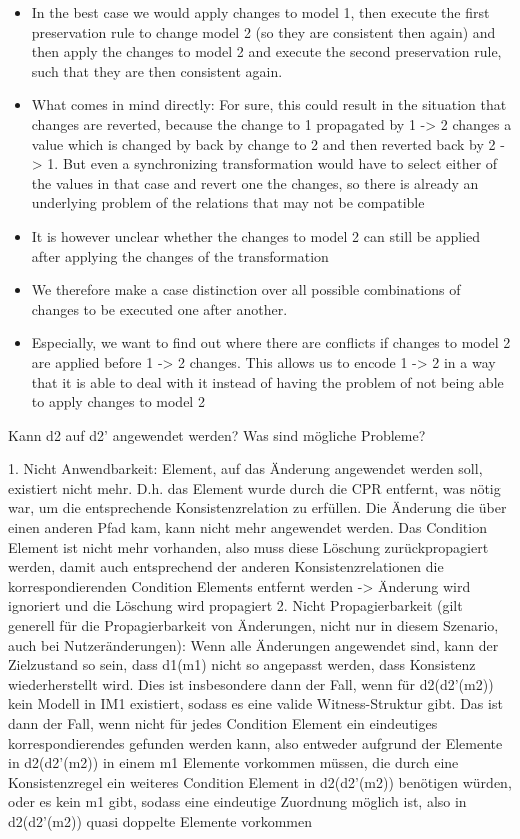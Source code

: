\begin{itemize}
    \item In the best case we would apply changes to model 1, then execute the first preservation rule to change model 2 (so they are consistent then again) and then apply the changes to model 2 and execute the second preservation rule, such that they are then consistent again.
    \item What comes in mind directly: For sure, this could result in the situation that changes are reverted, because the change to 1 propagated by 1 -> 2 changes a value which is changed by back by change to 2 and then reverted back by 2 -> 1. But even a synchronizing transformation would have to select either of the values in that case and revert one the changes, so there is already an underlying problem of the relations that may not be compatible
    \item It is however unclear whether the changes to model 2 can still be applied after applying the changes of the transformation 
    \item We therefore make a case distinction over all possible combinations of changes to be executed one after another.
    \item Especially, we want to find out where there are conflicts if changes to model 2 are applied before 1 -> 2 changes. This allows us to encode 1 -> 2 in a way that it is able to deal with it instead of having the problem of not being able to apply changes to model 2
\end{itemize}

Kann d2 auf d2' angewendet werden? Was sind mögliche Probleme?

1. Nicht Anwendbarkeit: Element, auf das Änderung angewendet werden soll, existiert nicht mehr. D.h. das Element wurde durch die CPR entfernt, was nötig war, um die entsprechende Konsistenzrelation zu erfüllen. Die Änderung die über einen anderen Pfad kam, kann nicht mehr angewendet werden. Das Condition Element ist nicht mehr vorhanden, also muss diese Löschung zurückpropagiert werden, damit auch entsprechend der anderen Konsistenzrelationen die korrespondierenden Condition Elements entfernt werden -> Änderung wird ignoriert und die Löschung wird propagiert
2. Nicht Propagierbarkeit (gilt generell für die Propagierbarkeit von Änderungen, nicht nur in diesem Szenario, auch bei Nutzeränderungen): Wenn alle Änderungen angewendet sind, kann der Zielzustand so sein, dass d1(m1) nicht so angepasst werden, dass Konsistenz wiederherstellt wird. Dies ist insbesondere dann der Fall, wenn für d2(d2'(m2)) kein Modell in IM1 existiert, sodass es eine valide Witness-Struktur gibt. Das ist dann der Fall, wenn nicht für jedes Condition Element ein eindeutiges korrespondierendes gefunden werden kann, also entweder aufgrund der Elemente in d2(d2'(m2)) in einem m1 Elemente vorkommen müssen, die durch eine Konsistenzregel ein weiteres Condition Element in d2(d2'(m2)) benötigen würden, oder es kein m1 gibt, sodass eine eindeutige Zuordnung möglich ist, also in d2(d2'(m2)) quasi doppelte Elemente vorkommen

